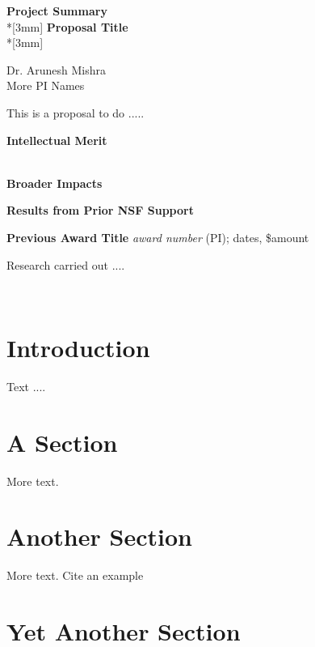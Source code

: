\documentclass{proposal}
\begin{document}
\begin{center}
{\Large{\bf Project Summary}}\\*[3mm]
{\bf Proposal Title} \\*[3mm]

Dr. Arunesh Mishra\\
More PI Names

\end{center}


This is a  proposal to do .....



\noindent
{\bf Intellectual Merit}

\ \\

\noindent
{\bf Broader Impacts}

\renewcommand{\thepage} {B--\arabic{page}}

\newpage


\renewcommand{\thepage} {D--\arabic{page}}

\newpage

\centerline{\bf Results from Prior NSF Support}

\noindent
{\bf Previous Award Title}
{\it award number} (PI); dates, \$amount

Research carried out ....

\ \\


\section{Introduction}

Text ....

\section{A Section}

More text.

\section{Another Section}

More text.  Cite an example \cite[]{sample_ref}

\section{Yet Another Section}
\end{document}
